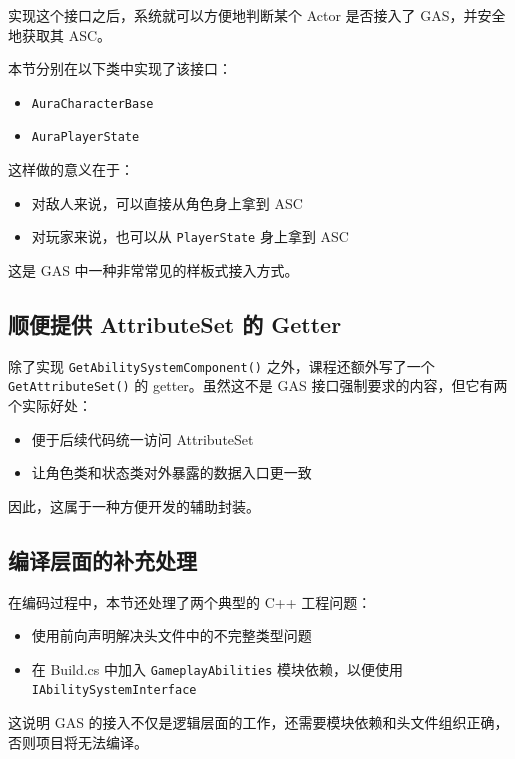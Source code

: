 实现这个接口之后，系统就可以方便地判断某个 Actor 是否接入了 GAS，并安全地获取其 ASC。

本节分别在以下类中实现了该接口：

\begin{itemize}
	\item \texttt{AuraCharacterBase}
	\item \texttt{AuraPlayerState}
\end{itemize}

这样做的意义在于：

\begin{itemize}
	\item 对敌人来说，可以直接从角色身上拿到 ASC
	\item 对玩家来说，也可以从 \texttt{PlayerState} 身上拿到 ASC
\end{itemize}

这是 GAS 中一种非常常见的样板式接入方式。

\subsection{顺便提供 AttributeSet 的 Getter}

除了实现 \texttt{GetAbilitySystemComponent()} 之外，课程还额外写了一个 \texttt{GetAttributeSet()} 的 getter。虽然这不是 GAS 接口强制要求的内容，但它有两个实际好处：

\begin{itemize}
	\item 便于后续代码统一访问 AttributeSet
	\item 让角色类和状态类对外暴露的数据入口更一致
\end{itemize}

因此，这属于一种方便开发的辅助封装。

\subsection{编译层面的补充处理}

在编码过程中，本节还处理了两个典型的 C++ 工程问题：

\begin{itemize}
	\item 使用前向声明解决头文件中的不完整类型问题
	\item 在 Build.cs 中加入 \texttt{GameplayAbilities} 模块依赖，以便使用 \texttt{IAbilitySystemInterface}
\end{itemize}

这说明 GAS 的接入不仅是逻辑层面的工作，还需要模块依赖和头文件组织正确，否则项目将无法编译。

